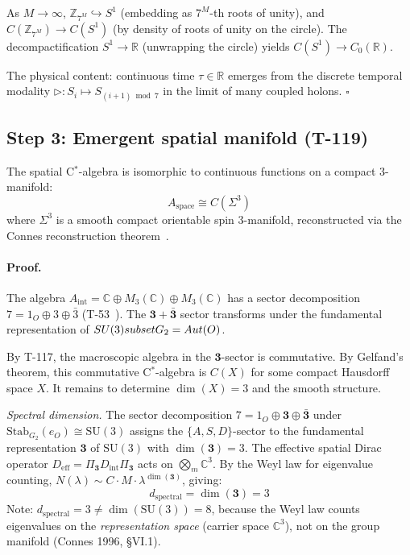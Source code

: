 As $M \to \infty$, $\mathbb{Z}_{7^M} \hookrightarrow S^1$ (embedding as $7^M$-th roots of
unity), and $C(\mathbb{Z}_{7^M}) \to C(S^1)$ (by density of roots of unity on the circle).
The decompactification $S^1 \to \mathbb{R}$ (unwrapping the circle) yields
$C(S^1) \to C_0(\mathbb{R})$.

The physical content: continuous time $\tau \in \mathbb{R}$ emerges from the discrete
temporal modality $\triangleright: S_i \mapsto S_{(i+1)\bmod 7}$ in the limit of many
coupled holons. $\square$

\subsection{Step 3: Emergent spatial manifold (T-119)}

\begin{theorembox}
The spatial C$^*$-algebra is isomorphic to continuous functions on a compact 3-manifold:
\begin{equation}
  A_{\mathrm{space}} \cong C(\Sigma^3)
  \label{eq:spatial-algebra}
\end{equation}
where $\Sigma^3$ is a smooth compact orientable spin 3-manifold, reconstructed via the
Connes reconstruction theorem~\cite{connes2008reconstruction}.
\end{theorembox}

\paragraph{Proof.}
The algebra $A_{\mathrm{int}} = \mathbb{C} \oplus M_3(\mathbb{C}) \oplus M_3(\mathbb{C})$
has a sector decomposition $7 = 1_O \oplus 3 \oplus \bar{3}$ (T-53~). The
$\mathbf{3} + \bar{\mathbf{3}}$ sector transforms under the fundamental representation
of $SU(3) subset G_2 = Aut(O)$.

By T-117, the macroscopic algebra in the $\mathbf{3}$-sector is commutative. By Gelfand's
theorem, this commutative C$^*$-algebra is $C(X)$ for some compact Hausdorff space $X$.
It remains to determine $\dim(X) = 3$ and the smooth structure.

\emph{Spectral dimension.} The sector decomposition $7 = 1_O \oplus \mathbf{3} \oplus \bar{\mathbf{3}}$ under $\mathrm{Stab}_{G_2}(e_O) \cong \mathrm{SU}(3)$ assigns the $\{A,S,D\}$-sector to the fundamental representation $\mathbf{3}$ of $\mathrm{SU}(3)$ with $\dim(\mathbf{3}) = 3$. The effective spatial Dirac operator $D_{\mathrm{eff}} = \Pi_{\mathbf{3}} D_{\mathrm{int}} \Pi_{\mathbf{3}}$ acts on $\bigotimes_m \mathbb{C}^3$. By the Weyl law for eigenvalue counting, $N(\lambda) \sim C \cdot M \cdot \lambda^{\dim(\mathbf{3})}$, giving:
\begin{equation}
  d_{\mathrm{spectral}} = \dim(\mathbf{3}) = 3
\end{equation}
Note: $d_{\mathrm{spectral}} = 3 \neq \dim(\mathrm{SU}(3)) = 8$, because the Weyl law counts eigenvalues on the \emph{representation space} (carrier space $\mathbb{C}^3$), not on the group manifold (Connes 1996, \S VI.1).

